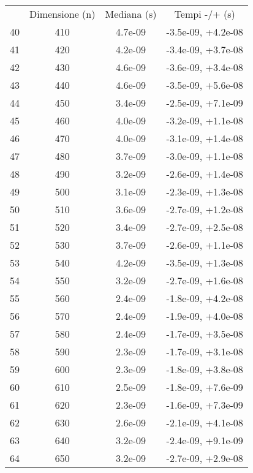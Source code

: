 \begin{table}
\centering
\begin{adjustbox}{width=1\textwidth/2}
\begin{tabular}{|c|c|c|c|}
\hline
 & Dimensione (n) & Mediana (s) & Tempi -/+ (s) \\
40 & 410 & 4.7e-09 & -3.5e-09, +4.2e-08 \\
\cline{1-4}
41 & 420 & 4.2e-09 & -3.4e-09, +3.7e-08 \\
\cline{1-4}
42 & 430 & 4.6e-09 & -3.6e-09, +3.4e-08 \\
\cline{1-4}
43 & 440 & 4.6e-09 & -3.5e-09, +5.6e-08 \\
\cline{1-4}
44 & 450 & 3.4e-09 & -2.5e-09, +7.1e-09 \\
\cline{1-4}
45 & 460 & 4.0e-09 & -3.2e-09, +1.1e-08 \\
\cline{1-4}
46 & 470 & 4.0e-09 & -3.1e-09, +1.4e-08 \\
\cline{1-4}
47 & 480 & 3.7e-09 & -3.0e-09, +1.1e-08 \\
\cline{1-4}
48 & 490 & 3.2e-09 & -2.6e-09, +1.4e-08 \\
\cline{1-4}
49 & 500 & 3.1e-09 & -2.3e-09, +1.3e-08 \\
\cline{1-4}
50 & 510 & 3.6e-09 & -2.7e-09, +1.2e-08 \\
\cline{1-4}
51 & 520 & 3.4e-09 & -2.7e-09, +2.5e-08 \\
\cline{1-4}
52 & 530 & 3.7e-09 & -2.6e-09, +1.1e-08 \\
\cline{1-4}
53 & 540 & 4.2e-09 & -3.5e-09, +1.3e-08 \\
\cline{1-4}
54 & 550 & 3.2e-09 & -2.7e-09, +1.6e-08 \\
\cline{1-4}
55 & 560 & 2.4e-09 & -1.8e-09, +4.2e-08 \\
\cline{1-4}
56 & 570 & 2.4e-09 & -1.9e-09, +4.0e-08 \\
\cline{1-4}
57 & 580 & 2.4e-09 & -1.7e-09, +3.5e-08 \\
\cline{1-4}
58 & 590 & 2.3e-09 & -1.7e-09, +3.1e-08 \\
\cline{1-4}
59 & 600 & 2.3e-09 & -1.8e-09, +3.8e-08 \\
\cline{1-4}
60 & 610 & 2.5e-09 & -1.8e-09, +7.6e-09 \\
\cline{1-4}
61 & 620 & 2.3e-09 & -1.6e-09, +7.3e-09 \\
\cline{1-4}
62 & 630 & 2.6e-09 & -2.1e-09, +4.1e-08 \\
\cline{1-4}
63 & 640 & 3.2e-09 & -2.4e-09, +9.1e-09 \\
\cline{1-4}
64 & 650 & 3.2e-09 & -2.7e-09, +2.9e-08 \\

\end{tabular}
\end{adjustbox}
\end{table}
